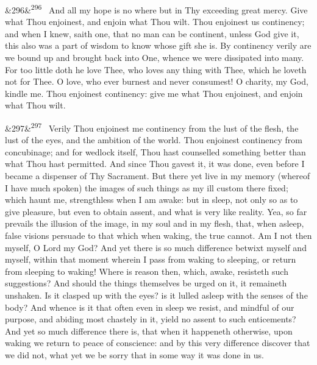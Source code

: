 \documentclass[12pt]{article}
\newcommand{\para}[1][]{\par\noindent\ifx&#1&\else\textsuperscript{\footnotesize #1}~\fi}
\begin{document}
\para[296] And all my hope is no where but in Thy exceeding great mercy. Give what Thou enjoinest, and enjoin what Thou wilt. Thou enjoinest us continency; and when I knew, saith one, that no man can be continent, unless God give it, this also was a part of wisdom to know whose gift she is. By continency verily are we bound up and brought back into One, whence we were dissipated into many. For too little doth he love Thee, who loves any thing with Thee, which he loveth not for Thee. O love, who ever burnest and never consumest! O charity, my God, kindle me. Thou enjoinest continency: give me what Thou enjoinest, and enjoin what Thou wilt.

\para[297] Verily Thou enjoinest me continency from the lust of the flesh, the lust of the eyes, and the ambition of the world. Thou enjoinest continency from concubinage; and for wedlock itself, Thou hast counselled something better than what Thou hast permitted. And since Thou gavest it, it was done, even before I became a dispenser of Thy Sacrament. But there yet live in my memory (whereof I have much spoken) the images of such things as my ill custom there fixed; which haunt me, strengthless when I am awake: but in sleep, not only so as to give pleasure, but even to obtain assent, and what is very like reality. Yea, so far prevails the illusion of the image, in my soul and in my flesh, that, when asleep, false visions persuade to that which when waking, the true cannot. Am I not then myself, O Lord my God? And yet there is so much difference betwixt myself and myself, within that moment wherein I pass from waking to sleeping, or return from sleeping to waking! Where is reason then, which, awake, resisteth such suggestions? And should the things themselves be urged on it, it remaineth unshaken. Is it clasped up with the eyes? is it lulled asleep with the senses of the body? And whence is it that often even in sleep we resist, and mindful of our purpose, and abiding most chastely in it, yield no assent to such enticements? And yet so much difference there is, that when it happeneth otherwise, upon waking we return to peace of conscience: and by this very difference discover that we did not, what yet we be sorry that in some way it was done in us.
\end{document}
